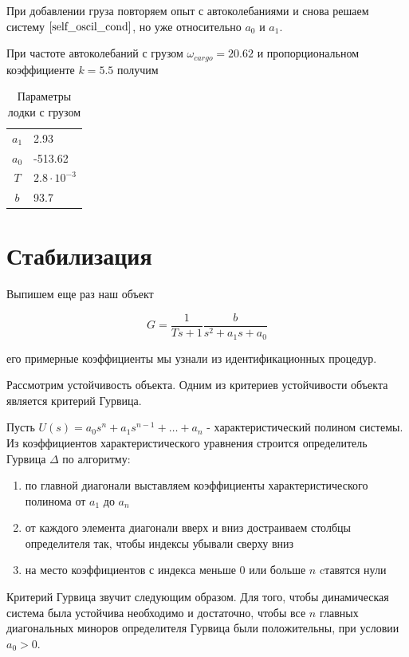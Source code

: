 \documentclass[a4paper]{article}
\begin{document}
При добавлении груза повторяем опыт с автоколебаниями и снова решаем систему $\ref{self_oscil_cond}$, но уже относительно $a_0$ и $a_1$.

При частоте автоколебаний с грузом $\omega_{cargo} = 20.62$ и пропорциональном коэффициенте $k = 5.5$ получим

\begin{table}[h]
	\caption{Параметры лодки с грузом}
	\label{table:boat_params_cargo}
	\begin{center}
		\begin{tabular}{cl}
			$a_1$ &  2.93 \\
			$a_0$ &  -513.62 \\
			$T$ & $2.8 \cdot 10^{-3}$ \\
			$b$ & 93.7 \\
		\end{tabular}
	\end{center}
\end{table}


\section{Стабилизация}

Выпишем еще раз наш объект

$$ G = \frac{1}{Ts+1} \frac{b}{s^2+a_1s+a_0} $$

его примерные коэффициенты мы узнали из идентификационных процедур.

Рассмотрим устойчивость объекта. Одним из критериев устойчивости объекта является критерий Гурвица.

Пусть $U(s) = a_0s^n + a_1s^{n-1} + \dots + a_n $ - характеристический полином системы. Из коэффициентов характеристического уравнения строится определитель Гурвица $\Delta$ по алгоритму:

\begin{enumerate}
	\item по главной диагонали выставляем коэффициенты характеристического полинома от $a_1$ до $a_n$
	\item от каждого элемента диагонали вверх и вниз достраиваем столбцы определителя так, чтобы индексы убывали сверху вниз
	\item на место коэффициентов с индекса меньше 0 или больше $n$ cтавятся нули
\end{enumerate}

Критерий Гурвица звучит следующим образом. Для того, чтобы динамическая система была устойчива необходимо и достаточно, чтобы все $n$ главных диагональных миноров определителя Гурвица были положительны, при условии $a_0 > 0$.
\end{document}

